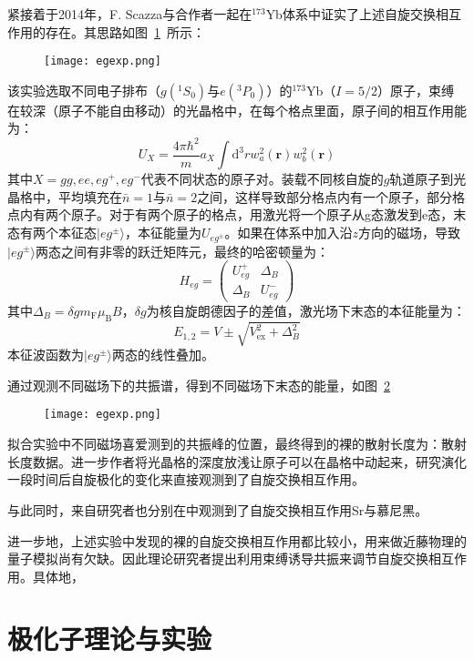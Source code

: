 紧接着于2014年，F. Scazza与合作者一起在${}^{173}$Yb体系中证实了上述自旋交换相互作用的存在。其思路如图~\ref{egexp}~所示：
\begin{figure}[!htbp]
    \centering
    \texttt{[image: egexp.png]}
    \label{egexp}
\end{figure}
该实验选取不同电子排布（$g({}^1S_0)$与$e({}^3P_0)$）的${}^{173}$Yb（$I=5/2$）原子，束缚在较深（原子不能自由移动）的光晶格中，在每个格点里面，原子间的相互作用能为：
\begin{equation}
U_{X}=\frac{4 \pi \hbar^{2}}{m} a_{X} \int \mathrm{d}^{3} r w_{a}^{2}(\mathbf{r}) w_{b}^{2}(\mathbf{r})
\end{equation}
其中$X =gg, ee, eg^+, eg^−$代表不同状态的原子对。装载不同核自旋的$g$轨道原子到光晶格中，平均填充在$\bar{n}=1$与$\bar{n}=2$之间，这样导致部分格点内有一个原子，部分格点内有两个原子。对于有两个原子的格点，用激光将一个原子从g态激发到e态，末态有两个本征态$|eg^\pm\rangle$，本征能量为$U_{eg^\pm}$。如果在体系中加入沿$z$方向的磁场，导致$|eg^\pm\rangle$两态之间有非零的跃迁矩阵元，最终的哈密顿量为：
\begin{equation}
H_{e g}=\left(\begin{array}{cc}
U_{e g}^{+} & \Delta_{B} \\
\Delta_{B} & U_{e g}^{-}
\end{array}\right)
\end{equation}
其中$\Delta_{B}=\delta g m_{\mathrm{F}} \mu_{\mathrm{B}} B$，$\delta g$为核自旋朗德因子的差值，激光场下末态的本征能量为：
\begin{equation}
E_{1,2}=V \pm \sqrt{V_{\mathrm{ex}}^{2}+\Delta_{B}^{2}}
\end{equation}
本征波函数为$|eg^\pm\rangle$两态的线性叠加。

通过观测不同磁场下的共振谱，得到不同磁场下末态的能量，如图~\ref{egd}~
\begin{figure}[!htbp]
    \centering
    \texttt{[image: egexp.png]}
    \label{egd}
\end{figure}
拟合实验中不同磁场喜爱测到的共振峰的位置，最终得到的裸的散射长度为：{\color{red}散射长度数据}。进一步作者将光晶格的深度放浅让原子可以在晶格中动起来，研究演化一段时间后自旋极化的变化来直接观测到了自旋交换相互作用。

与此同时，来自研究者也分别在中观测到了自旋交换相互作用{\color{red}Sr与慕尼黑}。

进一步地，上述实验中发现的裸的自旋交换相互作用都比较小，用来做近藤物理的量子模拟尚有欠缺。因此理论研究者提出利用束缚诱导共振来调节自旋交换相互作用。具体地，



\section{极化子理论与实验}


